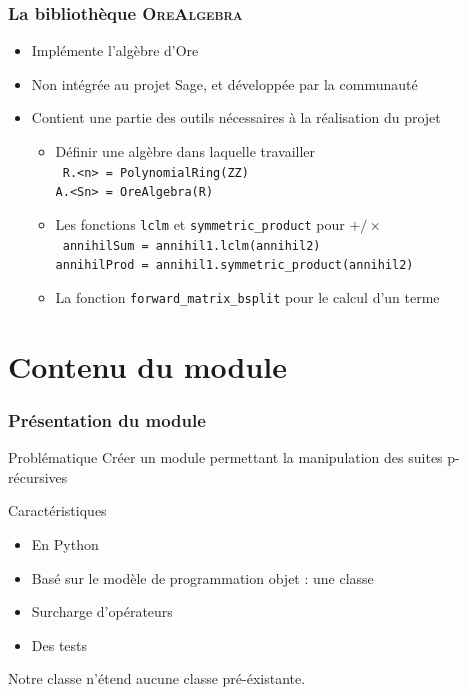 \documentclass{beamer}
\begin{document}
\begin{frame}
\frametitle{La bibliothèque \textsc{OreAlgebra}}
\begin{center}
\begin{itemize}
    \item Implémente l'algèbre d'Ore
    \item Non intégrée au projet Sage, et développée par la communauté
    \item Contient une partie des outils nécessaires à la réalisation du projet
        \begin{itemize}
            \item Définir une algèbre dans laquelle travailler\\
                \texttt{
                    R.<n> = PolynomialRing(ZZ)\\
                    \hspace{1.3ex}A.<Sn> = OreAlgebra(R)
                }
            \item Les fonctions \texttt{lclm} et \texttt{symmetric\_product} pour $+/\times$\\
                \texttt{
                    annihilSum = annihil1.lclm(annihil2)\\
                    \hspace{1.3ex}annihilProd = annihil1.symmetric\_product(annihil2)
                }
            \item La fonction \texttt{forward\_matrix\_bsplit} pour le calcul d'un terme
    \end{itemize}
\end{itemize}
\end{center}
\end{frame}

\section{Contenu du module}%

\begin{frame}
\frametitle{Présentation du module}
\begin{center}
\begin{alertblock}{Problématique}
    Créer un module permettant la manipulation des suites p-récursives
\end{alertblock}
\vspace{0.6cm}
\begin{block}{Caractéristiques}
    \begin{itemize}
        \item {\small En Python}
        \item Basé sur le modèle de programmation objet : une classe
        \item Surcharge d'opérateurs
        \item Des tests
    \end{itemize}
\end{block}
\vspace{0.6cm}
Notre classe n'étend aucune classe pré-éxistante.
\end{center}
\end{frame}
\end{document}
